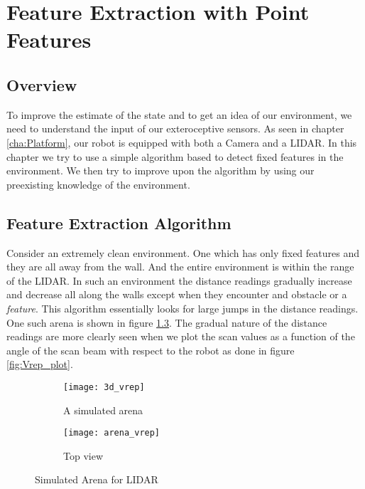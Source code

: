 \chapter{Feature Extraction with Point Features}

\section{Overview}

To improve the estimate of the state and to get an idea of our environment, we need to understand the input of our exteroceptive sensors. As seen in chapter \ref{cha:Platform}, our robot is equipped with both a Camera and a LIDAR. In this chapter we try to use a simple algorithm based to detect fixed features in the environment. We then try to improve upon the algorithm by using our preexisting knowledge of the environment.  

\section{Feature Extraction Algorithm}

Consider an extremely clean environment. One which has only fixed features and they are all away from the wall. And the entire environment is within the range of the LIDAR. In such an environment the distance readings gradually increase and decrease all along the walls except when they encounter and obstacle or a \textit{feature}. This algorithm essentially looks for large jumps in the distance readings. One such arena is shown in figure \ref{fig:Simulated_1}. The gradual nature of the distance readings are more clearly seen when we plot the scan values as a function of the angle of the scan beam with respect to the robot as done in figure \ref{fig:Vrep_plot}.
\begin{figure}[h!]
    \centering
    \begin{subfigure}[b]{0.3\textwidth}
	    \texttt{[image: 3d\_vrep]}
	    \caption{A simulated arena}
	    \label{fig:3d_vrep}
    \end{subfigure}
    \quad %
    \begin{subfigure}[b]{0.3\textwidth}
        \texttt{[image: arena\_vrep]}
        \caption{Top view}
        \label{fig:arena_vrep}
    \end{subfigure}%
        \caption{Simulated Arena for LIDAR}
        \label{fig:Simulated_1}
\end{figure}


